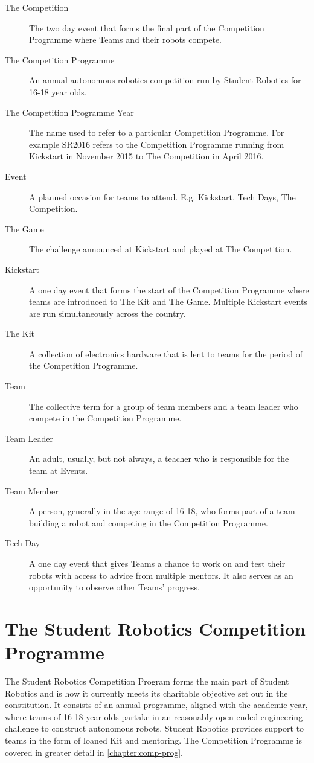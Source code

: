 \begin{description}
  \item[The Competition] The two day event that forms the final part of the Competition Programme where Teams and their robots compete.
  \item[The Competition Programme] An annual autonomous robotics competition run by Student Robotics for 16-18 year olds.
  \item[The Competition Programme Year] The name used to refer to a particular Competition Programme. For example SR2016 refers to the Competition Programme running from Kickstart in November 2015 to The Competition in April 2016.
  \item[Event] A planned occasion for teams to attend. E.g. Kickstart, Tech Days, The Competition.
  \item[The Game] The challenge announced at Kickstart and played at The Competition.
  \item[Kickstart] A one day event that forms the start of the Competition Programme where teams are introduced to The Kit and The Game. Multiple Kickstart events are run simultaneously across the country.
  \item[The Kit] A collection of electronics hardware that is lent to teams for the period of the Competition Programme.
  \item[Team] The collective term for a group of team members and a team leader who compete in the Competition Programme.
  \item[Team Leader] An adult, usually, but not always, a teacher who is responsible for the team at Events.
  \item[Team Member] A person, generally in the age range of 16-18, who forms part of a team building a robot and competing in the Competition Programme.
  \item[Tech Day] A one day event that gives Teams a chance to work on and test their robots with access to advice from multiple mentors. It also serves as an opportunity to observe other Teams' progress.
\end{description}

\section{The Student Robotics Competition Programme}

The Student Robotics Competition Program forms the main part of Student Robotics and is how it currently meets its charitable objective set out in the constitution. It consists of an annual programme, aligned with the academic year, where teams of 16-18 year-olds partake in an reasonably open-ended engineering challenge to construct autonomous robots. Student Robotics provides support to teams in the form of loaned Kit and mentoring. The Competition Programme is covered in greater detail in \autoref{chapter:comp-prog}.
